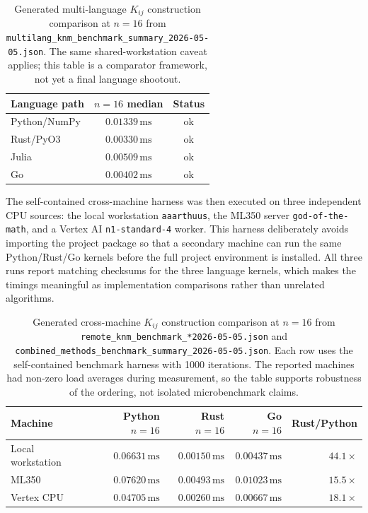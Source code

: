 \documentclass[preprint,aps,physrev,superscriptaddress,floatfix,longbibliography]{revtex4-2}
\begin{document}
\begin{table}[tb]
\centering
\small
\begin{tabular}{lcc}
\toprule
Language path & $n=16$ median & Status \\
\midrule
Python/NumPy & $0.01339\,\mathrm{ms}$ & ok \\
Rust/PyO3 & $0.00330\,\mathrm{ms}$ & ok \\
Julia & $0.00509\,\mathrm{ms}$ & ok \\
Go & $0.00402\,\mathrm{ms}$ & ok \\
\bottomrule
\end{tabular}
\caption{Generated multi-language $K_{ij}$ construction comparison at
$n=16$ from
\texttt{multilang\_knm\_benchmark\_summary\_2026-05-05.json}.
The same shared-workstation caveat applies; this table is a comparator
framework, not yet a final language shootout.}
\label{tab:multilang}
\end{table}

The self-contained cross-machine harness was then executed on three
independent CPU sources: the local workstation \texttt{aaarthuus}, the
ML350 server \texttt{god-of-the-math}, and a Vertex AI
\texttt{n1-standard-4} worker. This harness deliberately avoids importing
the project package so that a secondary machine can run the same
Python/Rust/Go kernels before the full project environment is installed.
All three runs report matching checksums for the three language kernels,
which makes the timings meaningful as implementation comparisons rather
than unrelated algorithms.

\begin{table}[tb]
\centering
\small
\begin{tabular}{lrrrr}
\toprule
Machine & Python $n=16$ & Rust $n=16$ & Go $n=16$ & Rust/Python \\
\midrule
Local workstation & $0.06631\,\mathrm{ms}$ & $0.00150\,\mathrm{ms}$ & $0.00437\,\mathrm{ms}$ & $44.1\times$ \\
ML350 & $0.07620\,\mathrm{ms}$ & $0.00493\,\mathrm{ms}$ & $0.01023\,\mathrm{ms}$ & $15.5\times$ \\
Vertex CPU & $0.04705\,\mathrm{ms}$ & $0.00260\,\mathrm{ms}$ & $0.00667\,\mathrm{ms}$ & $18.1\times$ \\
\bottomrule
\end{tabular}
\caption{Generated cross-machine $K_{ij}$ construction comparison at
$n=16$ from \texttt{remote\_knm\_benchmark\_*2026-05-05.json} and
\texttt{combined\_methods\_benchmark\_summary\_2026-05-05.json}. Each
row uses the self-contained benchmark harness with 1000 iterations. The
reported machines had non-zero load averages during measurement, so the
table supports robustness of the ordering, not isolated microbenchmark
claims.}
\label{tab:crossmachine}
\end{table}
\end{document}
